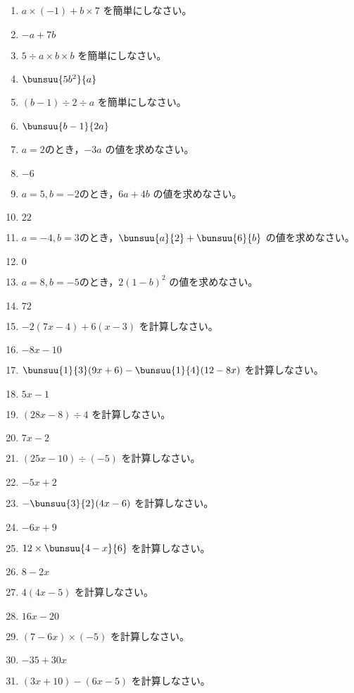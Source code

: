 \documentclass[uplatex,a4j,11pt]{jsreport}
\begin{document}
\begin{multicols}{2}
\begin{enumerate}
    \item $a \times (-1) + b \times 7$ を簡単にしなさい。%
    \item $-a+7b$
    \item $5 \div a \times b \times b$ を簡単にしなさい。%
    \item $\bunsuu{5b^2}{a}$
    \item $(b - 1) \div 2 \div a$ を簡単にしなさい。%
    \item $\bunsuu{b-1}{2a}$
    \item $a=2$のとき，$-3a$ の値を求めなさい。%
    \item $-6$
    \item $a=5, b=-2$のとき，$6a+4b$ の値を求めなさい。%
    \item $22$
    \item $a=-4, b=3$のとき，$\bunsuu{a}{2}+\bunsuu{6}{b}$ の値を求めなさい。%
    \item $0$
    \item $a=8, b=-5$のとき，$2(1-b)^2$ の値を求めなさい。%
    \item $72$
    \item $-2(7x-4)+6(x-3)$ を計算しなさい。%
    \item $-8x-10$
    \item $\bunsuu{1}{3}(9x+6)-\bunsuu{1}{4}(12-8x)$ を計算しなさい。%
    \item $5x-1$
    \item $(28x -8)\div4$ を計算しなさい。%
    \item $7x-2$
    \item $(25x -10)\div(-5)$ を計算しなさい。%
    \item $-5x+2$
    \item $-\bunsuu{3}{2}(4x-6)$ を計算しなさい。%
    \item $-6x+9$
    \item $12\times\bunsuu{4-x}{6}$ を計算しなさい。%
    \item $8-2x$
    \item $4(4x-5)$ を計算しなさい。%
    \item $16x-20$
    \item $(7-6x)\times(-5)$ を計算しなさい。%
    \item $-35+30x$
    \item $(3x+10)-(6x-5)$ を計算しなさい。%

\end{enumerate}
\end{multicols}
\end{document}
